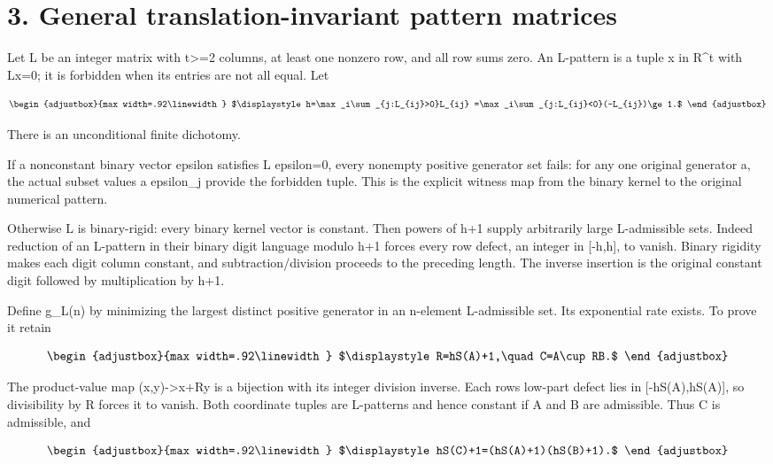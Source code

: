 \section{3. General translation-invariant pattern matrices}\label{n23-general-translation-invariant-pattern-matrices}

Let L be an integer matrix with t\textgreater=2 columns, at least one nonzero row, and all row sums zero. An L-pattern is a tuple x in R\^{}t with Lx=0; it is forbidden when its entries are not all equal. Let

\[
\begin{adjustbox}{max width=.92\linewidth}
$\displaystyle h=\max_i\sum_{j:L_{ij}>0}L_{ij}
=\max_i\sum_{j:L_{ij}<0}(-L_{ij})\ge1.$
\end{adjustbox}
\]

There is an unconditional finite dichotomy.

If a nonconstant binary vector epsilon satisfies L epsilon=0, every nonempty positive generator set fails: for any one original generator a, the actual subset values a epsilon\_j provide the forbidden tuple. This is the explicit witness map from the binary kernel to the original numerical pattern.

Otherwise L is binary-rigid: every binary kernel vector is constant. Then powers of h+1 supply arbitrarily large L-admissible sets. Indeed reduction of an L-pattern in their binary digit language modulo h+1 forces every row defect, an integer in {[}-h,h{]}, to vanish. Binary rigidity makes each digit column constant, and subtraction/division proceeds to the preceding length. The inverse insertion is the original constant digit followed by multiplication by h+1.

Define g\_L(n) by minimizing the largest distinct positive generator in an n-element L-admissible set. Its exponential rate exists. To prove it retain

\[
\begin{adjustbox}{max width=.92\linewidth}
$\displaystyle R=hS(A)+1,\quad C=A\cup RB.$
\end{adjustbox}
\]

The product-value map (x,y)-\textgreater x+Ry is a bijection with its integer division inverse. Each row\textquotesingle s low-part defect lies in {[}-hS(A),hS(A){]}, so divisibility by R forces it to vanish. Both coordinate tuples are L-patterns and hence constant if A and B are admissible. Thus C is admissible, and

\[
\begin{adjustbox}{max width=.92\linewidth}
$\displaystyle hS(C)+1=(hS(A)+1)(hS(B)+1).$
\end{adjustbox}
\]

